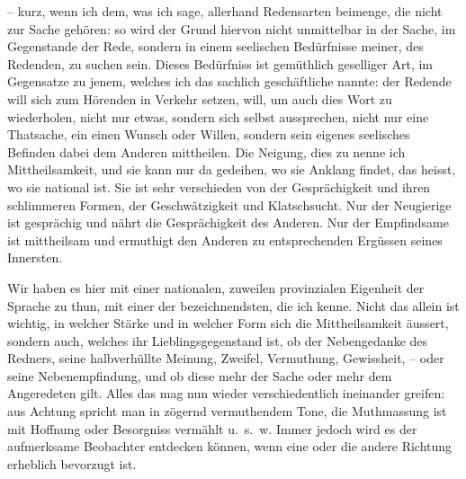– kurz, wenn ich dem, was ich sage, allerhand Redensarten beimenge, die nicht zur Sache gehören: so wird der Grund hiervon nicht unmittelbar in der Sache, im Gegenstande der Rede, sondern in einem seelischen Bedürfnisse meiner, des Redenden, zu suchen sein. Dieses Be\label{fp.454}dürfniss ist gemüthlich geselliger Art, im Gegensatze zu jenem, welches ich das sachlich geschäftliche nannte: der Redende will sich zum Hörenden in  Verkehr setzen, will, um auch dies Wort zu wiederholen, nicht nur etwas, sondern sich selbst aussprechen, nicht nur eine Thatsache, ein  einen Wunsch oder Willen, sondern sein eigenes seelisches Befinden dabei dem Anderen mittheilen. Die Neigung, dies zu  nenne ich Mittheilsamkeit, und sie kann nur da gedeihen, wo sie Anklang findet, das heisst, wo sie national ist. Sie ist sehr verschieden von der Gesprächigkeit und ihren schlimmeren Formen, der Geschwätzigkeit und Klatschsucht. Nur der Neugierige ist gesprächig und nährt die Gesprächigkeit des Anderen. Nur der Empfindsame ist mittheilsam und ermuthigt den Anderen zu entsprechenden Ergüssen seines Innersten. 

Wir haben es hier mit einer  nationalen, zuweilen provinzialen Eigenheit der Sprache zu thun, mit einer der bezeichnendsten, die ich kenne. Nicht \label{sp.473} das allein ist wichtig, in welcher Stärke und in welcher Form sich die Mittheilsamkeit äussert, sondern auch, welches ihr Lieblingsgegenstand ist, ob der Nebengedanke des Redners, seine halbverhüllte Meinung, Zweifel, Vermuthung, Gewissheit, – oder seine Nebenempfindung, und ob diese mehr der Sache oder mehr dem Angeredeten gilt. Alles das mag nun wieder verschiedentlich ineinander greifen: aus Achtung spricht man in zögernd vermuthendem Tone, die Muthmassung ist mit Hoffnung oder Besorgniss vermählt u.~s.~w. Immer jedoch wird es der aufmerksame Beobachter entdecken können, wenn eine oder die andere Richtung erheblich bevorzugt ist.

\largerpage[-1]

